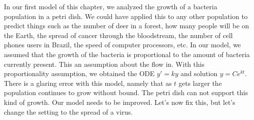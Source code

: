 
In our first model of this chapter, we analyzed the growth of a bacteria population in a petri dish. 
We could have applied this to any other population to predict things such as the number of deer in a forest, how many people will be on the Earth, the spread of cancer through the bloodstream, the number of cell phones users in Brazil, the speed of computer processors, etc. 
In our model, we assumed that the growth of the bacteria is proportional to the amount of bacteria currently present. 
This an assumption about the flow in. 
With this proportionality assumption, we obtained the ODE $y'=ky$ and solution $y=Ce^{kt}$.  
There is a glaring error with this model, namely that as $t$ gets larger the population continues to grow without bound. 
The petri dish can not support this kind of growth. Our model needs to be improved.
Let's now fix this, but let's change the setting to the spread of a virus.

